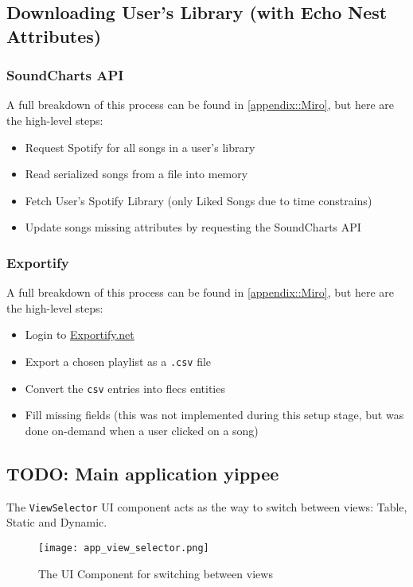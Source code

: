 \subsection{Downloading User's Library (with Echo Nest Attributes)}
\subsubsection{SoundCharts API}
A full breakdown of this process can be found in \ref{appendix::Miro}, but here are the high-level steps:\begin{itemize}
    \item Request Spotify for all songs in a user's library
    \item Read serialized songs from a file into memory
    \item Fetch User's Spotify Library (only Liked Songs due to time constrains)
    \item Update songs missing attributes by requesting the SoundCharts API
\end{itemize}

\subsubsection{Exportify}
A full breakdown of this process can be found in \ref{appendix::Miro}, but here are the high-level steps:\begin{itemize}
    \item Login to \href{https://exportify.net/}{Exportify.net}
    \item Export a chosen playlist as a \texttt{.csv} file
    \item Convert the \texttt{csv} entries into flecs entities
    \item Fill missing fields (this was not implemented during this setup stage, but was done on-demand when a user clicked on a song)
\end{itemize}

\subsection{TODO: Main application yippee}
The \texttt{ViewSelector} UI component acts as the way to switch between views: Table, Static and Dynamic.
\begin{figure}[h]
    \centering
    \texttt{[image: app\_view\_selector.png]}
    \caption{The UI Component for switching between views}
\end{figure}

